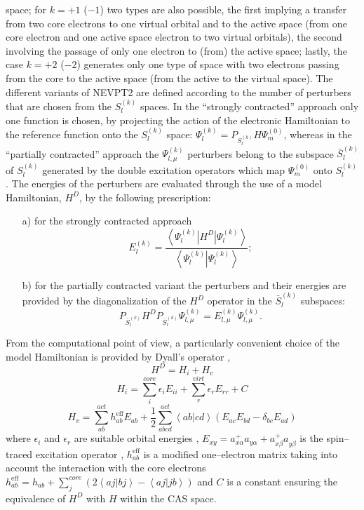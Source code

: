 \documentclass[global,referee]{svjour}
\newcommand{\bracket}[3]{\left<#1\left|#2\right|#3\right>}
\newcommand{\scal}[2]{\left<#1\left|\right.#2\right>}
\newcommand{\psimz}{\Psi_m^{(0)}}
\newcommand{\pertus}{S_l^{(k)}}
\newcommand{\pertup}[2]{\Psi_{#1}^{({#2})}}
\newcommand{\pertusb}{\bar{S}_l^{(k)}}
\newcommand{\psilmk}{\Psi_{l,\mu}^{(k)}}
\newcommand{\pertue}[2]{E_{#1}^{({#2})}}
\newcommand{\elmk}{E_{l,\mu}^{(k)}}
\newcommand{\E}[1]{E_{#1}}
\newcommand{\crea}[1]{a_{#1}^{+}}
\newcommand{\dist}[1]{a_{#1}^{\phantom{+}}}
\newcommand{\heff}[1]{h_{#1}^{\mathrm{eff}}}
\newcommand{\half}{\frac{1}{2}}
\begin{document}
space; for $k=+1$ ($-1$) two types are also possible, the first
implying a transfer from two core electrons to one virtual orbital and
to the active space (from one core electron and one active space
electron to two virtual orbitals), the second involving the passage of
only one electron to (from) the active space; lastly, the case $k=+2$
($-2$) generates only one type of space with two electrons passing
from the core to the active space (from the active to the virtual
space). The different variants of NEVPT2 are defined according to the
number of perturbers that are chosen from the $\pertus$ spaces. In the
``strongly contracted'' approach only one function is chosen, by
projecting the action of the electronic Hamiltonian to the reference
function onto the $\pertus$ space: $  \pertup{l}{k} =
P_{\pertus}H\psimz$, whereas in the ``partially contracted'' approach
the $ \psilmk$ perturbers belong to the subspace $\pertusb$ of
$\pertus$ generated by the double excitation operators which map
$\psimz$ onto $\pertus$. The energies of the perturbers are evaluated
through the use of a model Hamiltonian, $H^D$, by the following
prescription: 
\begin{itemize}
\item[a)]for the strongly contracted approach 
  \begin{displaymath}
  \pertue{l}{k} =
  \frac{\bracket{\pertup{l}{k}}{H^D}{\pertup{l}{k}}}
  {\scal{\pertup{l}{k}}{\pertup{l}{k}}};
  \end{displaymath}
\item[b)]for the partially
  contracted variant the perturbers and their energies are provided by
  the diagonalization of the $H^D$ operator in the $\pertusb$
  subspaces:
  \begin{displaymath}
   P_{\pertusb}H^DP_{\pertusb} \psilmk = \elmk\psilmk.
  \end{displaymath}
\end{itemize}

From the computational point of view, a particularly convenient choice
of the model Hamiltonian is provided by Dyall's operator \cite{Dyall95},
\begin{equation}
  \label{eq:dyall}
  H^D = H_i + H_v
\end{equation}
\begin{equation}
  \label{eq:dyall2}
H_i = \sum_{i}^{core}\epsilon_{i}\E{ii} +
\sum_{r}^{virt}\epsilon_{r}\E{rr} +C
\end{equation}
\begin{equation}
  \label{eq:dyall3}
  H_v = \sum_{ab}^{act}\heff{ab}\E{ab} +\half\sum_{abcd}^{act}
  \scal{ab}{cd} (\E{ac}\E{bd}-\delta_{bc}\E{ad})
\end{equation}
where  $\epsilon_i$ and $\epsilon_r$ are suitable orbital energies \cite{Angeli2000},
$\E{xy} = \crea{x\alpha}\dist{y\alpha} +
\crea{x\beta}\dist{y\beta}$ is the spin--traced excitation
operator \cite{Mcweeny},  $ \heff{ab}$ is a modified one--electron
matrix taking into account the interaction with the core electrons
$\heff{ab} = h_{ab} + \sum_{j}^{core}( 2\scal{aj}{bj} -
  \scal{aj}{jb})$ and $C$ is a constant ensuring the equivalence of
  $H^D$ with $H$ within the CAS space.
\end{document}
